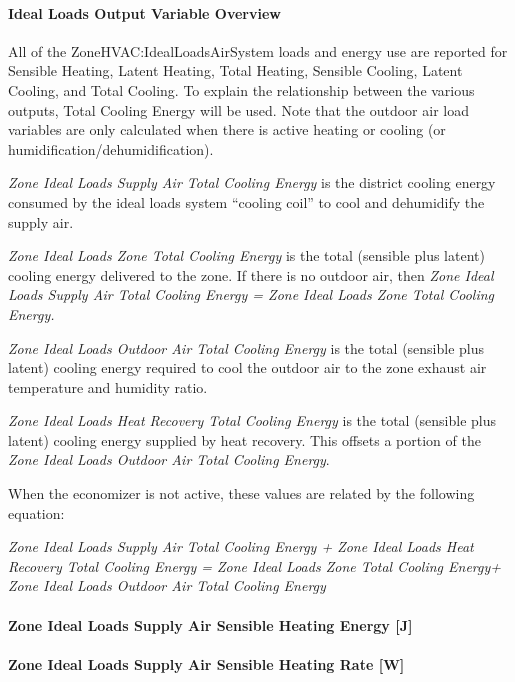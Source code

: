 \paragraph{Ideal Loads Output Variable Overview}\label{ideal-loads-output-variable-overview}

All of the ZoneHVAC:IdealLoadsAirSystem loads and energy use are reported for Sensible Heating, Latent Heating, Total Heating, Sensible Cooling, Latent Cooling, and Total Cooling. To explain the relationship between the various outputs, Total Cooling Energy will be used. Note that the outdoor air load variables are only calculated when there is active heating or cooling (or humidification/dehumidification).

\emph{Zone Ideal Loads Supply Air Total Cooling Energy} is the district cooling energy consumed by the ideal loads system ``cooling coil'' to cool and dehumidify the supply air.

\emph{Zone Ideal Loads Zone Total Cooling Energy} is the total (sensible plus latent) cooling energy delivered to the zone. If there is no outdoor air, then \emph{Zone Ideal Loads Supply Air Total Cooling Energy = Zone Ideal Loads Zone Total Cooling Energy.}

\emph{Zone Ideal Loads Outdoor Air Total Cooling Energy} is the total (sensible plus latent) cooling energy required to cool the outdoor air to the zone exhaust air temperature and humidity ratio.

\emph{Zone Ideal Loads Heat Recovery Total Cooling Energy} is the total (sensible plus latent) cooling energy supplied by heat recovery. This offsets a portion of the \emph{Zone Ideal Loads Outdoor Air Total Cooling Energy}.

When the economizer is not active, these values are related by the following equation:

\emph{Zone Ideal Loads Supply Air Total Cooling Energy + Zone Ideal Loads Heat Recovery Total Cooling Energy = Zone Ideal Loads Zone Total Cooling Energy+ Zone Ideal Loads Outdoor Air Total Cooling Energy}

\paragraph{Zone Ideal Loads Supply Air Sensible Heating Energy {[}J{]}}\label{zone-ideal-loads-supply-air-sensible-heating-energy-j}

\paragraph{Zone Ideal Loads Supply Air Sensible Heating Rate {[}W{]}}\label{zone-ideal-loads-supply-air-sensible-heating-rate-w}

